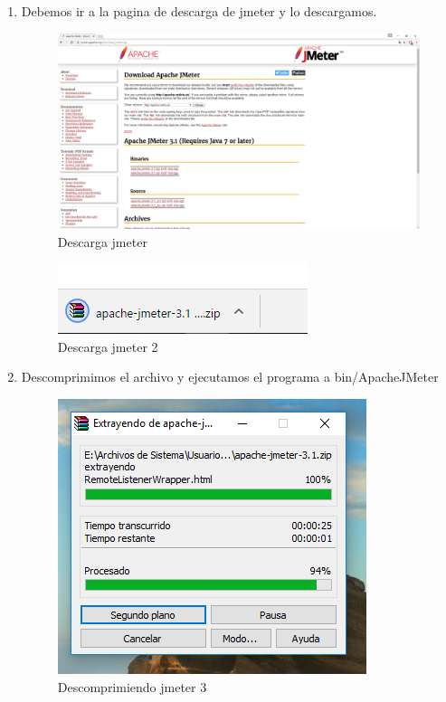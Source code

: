 \begin{enumerate}
	\item Debemos ir a la pagina de descarga \cite{descarga} de jmeter \cite{jmeter} y lo descargamos.
	
	\begin{figure}[H] %
		\centering
		\includegraphics[scale=0.3]{pics/1}  %
		\caption{Descarga jmeter} \label{fig:jmt1}
	\end{figure}

	\begin{figure}[H] %
	\centering
	\includegraphics[scale=0.3]{pics/2}  %
	\caption{Descarga jmeter 2} \label{fig:jmt2}
	\end{figure}

	\item Descomprimimos el archivo y ejecutamos el programa a bin/ApacheJMeter 
	
	\begin{figure}[H] %
		\centering
		\includegraphics[scale=0.3]{pics/3}  %
		\caption{Descomprimiendo jmeter 3} \label{fig:jmt3}
	\end{figure}


\end{enumerate}
